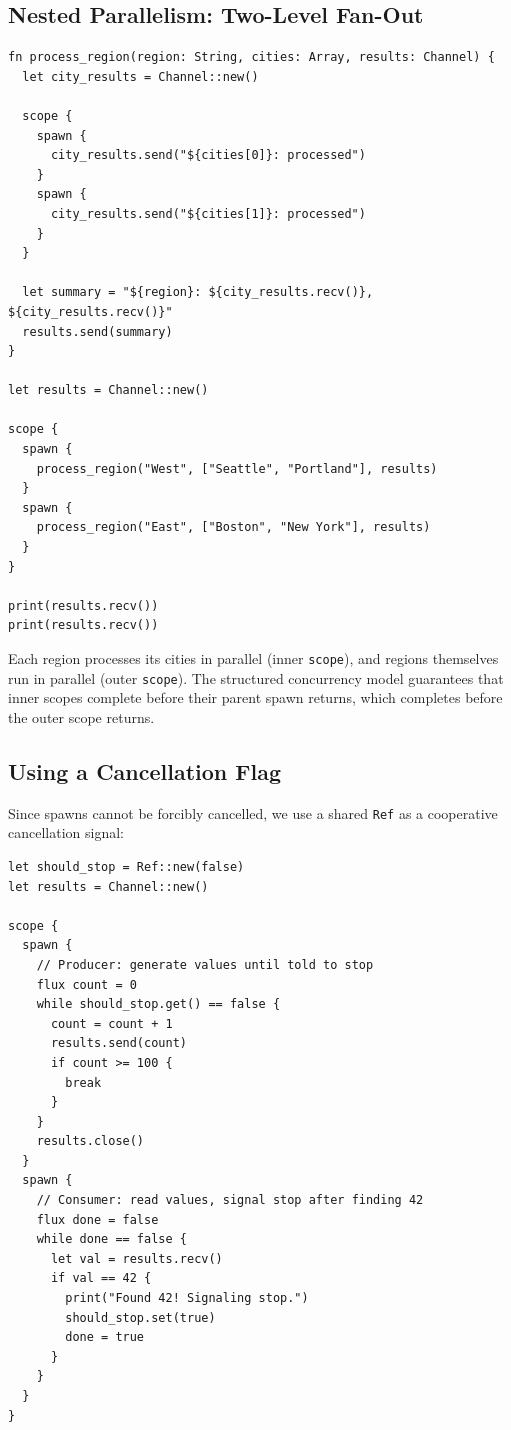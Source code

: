 \subsection{Nested Parallelism: Two-Level Fan-Out}

\begin{lstlisting}[language=Lattice, caption={Nested scope for two-level parallelism}]
fn process_region(region: String, cities: Array, results: Channel) {
  let city_results = Channel::new()

  scope {
    spawn {
      city_results.send("${cities[0]}: processed")
    }
    spawn {
      city_results.send("${cities[1]}: processed")
    }
  }

  let summary = "${region}: ${city_results.recv()}, ${city_results.recv()}"
  results.send(summary)
}

let results = Channel::new()

scope {
  spawn {
    process_region("West", ["Seattle", "Portland"], results)
  }
  spawn {
    process_region("East", ["Boston", "New York"], results)
  }
}

print(results.recv())
print(results.recv())
\end{lstlisting}

Each region processes its cities in parallel (inner \lstinline|scope|), and regions themselves run in parallel (outer \lstinline|scope|).
The structured concurrency model guarantees that inner scopes complete before their parent spawn returns, which completes before the outer scope returns.

\subsection{Using a Cancellation Flag}


Since spawns cannot be forcibly cancelled, we use a shared \lstinline|Ref| as a cooperative cancellation signal:

\begin{lstlisting}[language=Lattice, caption={Cooperative cancellation with Ref}]
let should_stop = Ref::new(false)
let results = Channel::new()

scope {
  spawn {
    // Producer: generate values until told to stop
    flux count = 0
    while should_stop.get() == false {
      count = count + 1
      results.send(count)
      if count >= 100 {
        break
      }
    }
    results.close()
  }
  spawn {
    // Consumer: read values, signal stop after finding 42
    flux done = false
    while done == false {
      let val = results.recv()
      if val == 42 {
        print("Found 42! Signaling stop.")
        should_stop.set(true)
        done = true
      }
    }
  }
}
\end{lstlisting}

